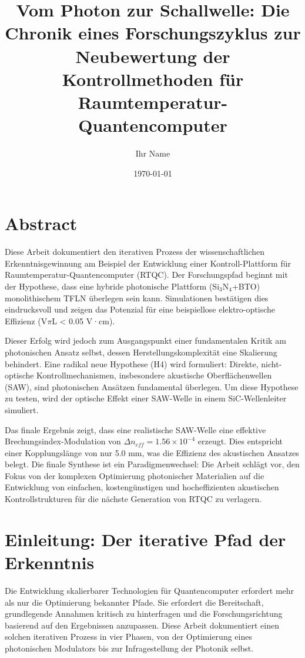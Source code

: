 \documentclass[12pt, a4paper, numbers]{report}
\title{Vom Photon zur Schallwelle: Die Chronik eines Forschungszyklus zur Neubewertung der Kontrollmethoden für Raumtemperatur-Quantencomputer}
\author{Ihr Name}
\date{\today}
\begin{document}

\maketitle
\tableofcontents
\listoffigures
\listoftables

\chapter*{Abstract}
Diese Arbeit dokumentiert den iterativen Prozess der wissenschaftlichen Erkenntnisgewinnung am Beispiel der Entwicklung einer Kontroll-Plattform für Raumtemperatur-Quantencomputer (RTQC). Der Forschungspfad beginnt mit der Hypothese, dass eine hybride photonische Plattform (Si$_3$N$_4$+BTO) monolithischem TFLN überlegen sein kann. Simulationen bestätigen dies eindrucksvoll und zeigen das Potenzial für eine beispiellose elektro-optische Effizienz (V$\pi$L < 0.05 V·cm).

Dieser Erfolg wird jedoch zum Ausgangspunkt einer fundamentalen Kritik am photonischen Ansatz selbst, dessen Herstellungskomplexität eine Skalierung behindert. Eine radikal neue Hypothese (H4) wird formuliert: Direkte, nicht-optische Kontrollmechanismen, insbesondere akustische Oberflächenwellen (SAW), sind photonischen Ansätzen fundamental überlegen. Um diese Hypothese zu testen, wird der optische Effekt einer SAW-Welle in einem SiC-Wellenleiter simuliert.

Das finale Ergebnis zeigt, dass eine realistische SAW-Welle eine effektive Brechungsindex-Modulation von $\Delta n_{eff} = 1.56 \times 10^{-4}$ erzeugt. Dies entspricht einer Kopplungslänge von nur 5.0 mm, was die Effizienz des akustischen Ansatzes belegt. Die finale Synthese ist ein Paradigmenwechsel: Die Arbeit schlägt vor, den Fokus von der komplexen Optimierung photonischer Materialien auf die Entwicklung von einfachen, kostengünstigen und hocheffizienten akustischen Kontrollstrukturen für die nächste Generation von RTQC zu verlagern.

\chapter{Einleitung: Der iterative Pfad der Erkenntnis}
Die Entwicklung skalierbarer Technologien für Quantencomputer erfordert mehr als nur die Optimierung bekannter Pfade. Sie erfordert die Bereitschaft, grundlegende Annahmen kritisch zu hinterfragen und die Forschungsrichtung basierend auf den Ergebnissen anzupassen. Diese Arbeit dokumentiert einen solchen iterativen Prozess in vier Phasen, von der Optimierung eines photonischen Modulators bis zur Infragestellung der Photonik selbst.
\end{document}

